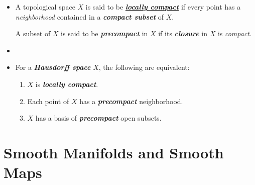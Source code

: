 \documentclass[11pt]{article}
\begin{document}
\begin{itemize}
\item \begin{definition}
A topological space $X$ is said to be \underline{\emph{\textbf{locally compact}}} if every point has a \emph{neighborhood} contained in a \emph{\textbf{compact subset}} of $X$. 

A subset of $X$ is said to be \emph{\textbf{precompact}} in $X$ if its \emph{\textbf{closure}} in $X$ is \emph{compact}.
\end{definition}

\item 

\item For a \emph{\textbf{Hausdorff space}} $X$,  the following are equivalent:
\begin{enumerate}
\item $X$ is \emph{\textbf{locally compact}}.
\item Each point of $X$ has a \emph{\textbf{precompact}} neighborhood. 
\item $X$ has a basis of \emph{\textbf{precompact}} open subsets.
\end{enumerate}
\end{itemize}


\newpage
\section{Smooth Manifolds and Smooth Maps}
\end{document}
